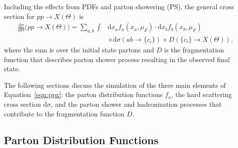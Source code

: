 Including the effects from PDFs and parton showering (PS), the general cross section for $pp \rightarrow X(\Theta)$ is
\begin{align}
  \label{eqn:ppx}
  \frac{\text{d}\sigma}{\text{d}\Theta} \Big(pp \rightarrow X(\Theta) \Big) =
  \sum_{a,b} \int & \text{d} x_a f_a(x_a, \mu_F) \cdot \text{d} x_b f_b(x_b, \mu_F)  \nonumber \\
  & \times \text{d}\sigma \left(ab \rightarrow \{c_i\} \right)
  \times D \left( \{c_i\} \rightarrow X(\Theta) \right), 
\end{align}
where the sum is over the initial state partons and $D$ is the
fragmentation function that describes parton shower process resulting
in the observed final state. 

The following sections discuss the simulation of the three main elements of Equation~\ref{eqn:ppx}: the parton distribution functions $f_a$, the hard scattering cross section $\text{d}\sigma$, and the parton shower and hadronization processes that contribute to the fragmentation function $D$.

\subsection{Parton Distribution Functions}

